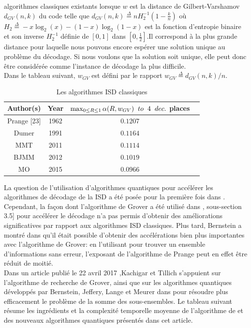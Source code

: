 \documentclass[12pt,openany]{report}
\begin{document}
algorithmes classiques existants lorsque $w$ est la distance de Gilbert-Varshamov $d_{GV}(n, k)$ du code telle que $d_{GV}(n, k)\overset{\Delta}{=} n \mathit{H}^{-1}_{2}\left( 1-\frac{k}{n} \right) $ où \\ $\mathit{H}_{2} \overset{\Delta}{=}-x\log_2(x)-(1-x)\log_2(1-x) $ est la fonction d'entropie binaire et son inverse $ \mathit{H}^{-1}_2 $ définie de $\left[ 0,1 \right] $ dans $ \left[0,\frac{1}{2} \right]$.Il correspond à la plus grande distance pour laquelle nous pouvons encore espérer une solution unique au problème du décodage. Si nous voulons que la solution soit unique, elle peut donc être considérée comme l'instance de décodage la plus difficile.\\
 Dans le tableau suivant, $w_{GV}$ est défini par le rapport $w_{GV}\overset{\Delta}{=}d_{GV}(n,k)/n$.
 \begin{table}
 \centering
\begin{tabular}{ |c|c|c|c| } 
\hline
Author(s)& Year& $\max_{0\leq R \leq 1}\alpha(R,w_{GV}) \hspace{0.2cm} to\hspace{0.2cm} 4 \hspace{0.2cm} dec.$ places \\
\hline
Prange [23] & 1962& $0.1207$\\
\hline
Dumer \cite{Dumer11} & 1991&$ 0.1164 $\\
\hline
MMT \cite{Mmt11} & 2011& $0.1114   $\\
\hline
BJMM \cite{Bjmm2} &2012&$ 0.1019   $\\
\hline
MO \cite{Mo19} &  2015& $0.0966 $\\
\hline

\end{tabular}
\caption{Les algorithmes ISD classiques}
\label{isd_classics}
\end{table}

La question de l'utilisation d'algorithmes quantiques pour accélérer les algorithmes de décodage de la ISD a été posée pour la première fois dans \cite{Over22}.
 Cependant, la façon dont l'algorithme de Grover a été utilisé dans ,\cite{Over22} sous-section 3.5] pour accélérer le décodage n'a pas permis d'obtenir des améliorations significatives par rapport aux algorithmes ISD classiques. Plus tard, Bernstein
 a montré dans \cite{Berst5} qu'il était possible d'obtenir des accélérations bien plus importantes avec l'algorithme de Grover: en l'utilisant pour trouver un ensemble d'informations sans erreur, l'exposant de l'algorithme de Prange peut en effet être réduit de moitié.\\
 Dans un article publié le 22 avril 2017 \cite{Kati9},Kachigar et Tillich  s'appuient sur  l'algorithme de recherche de Grover, ainsi que sur les algorithmes quantiques 
développés par Bernstein, Jeffery, Lange et Meurer dans \cite{Bernstein6} pour résoudre plus efficacement le problème de la somme des sous-ensembles. Le tableau suivant résume les ingrédients et la complexité temporelle moyenne
de l'algorithme de \cite{Berst5} et des nouveaux algorithmes quantiques présentés dans cet article.
\end{document}
